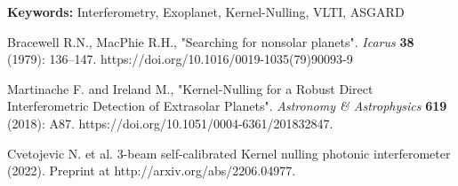 \documentclass[12pt]{article}
\begin{document}
\textbf{\large Keywords:} Interferometry, Exoplanet, Kernel-Nulling, VLTI, ASGARD 

\begin{thebibliography}{60}

 Bracewell R.N., MacPhie R.H., "Searching for nonsolar planets". {\it Icarus} \textbf{38} (1979): 136–147. https://doi.org/10.1016/0019-1035(79)90093-9

  Martinache F. and Ireland M., "Kernel-Nulling for a Robust Direct Interferometric Detection of Extrasolar Planets". {\it Astronomy \& Astrophysics} \textbf{619} (2018): A87. https://doi.org/10.1051/0004-6361/201832847.


 Cvetojevic N. et al. 3-beam self-calibrated Kernel nulling photonic interferometer (2022). Preprint at http://arxiv.org/abs/2206.04977.

\end{thebibliography}
\end{document}
